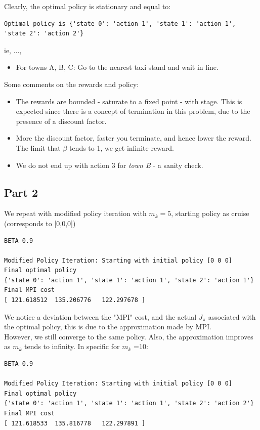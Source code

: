 Clearly, the optimal policy is stationary and equal to:
\begin{lstlisting}[numbers = none]
Optimal policy is {'state 0': 'action 1', 'state 1': 'action 1', 'state 2': 'action 2'}
\end{lstlisting}

ie, ...,

\begin{itemize}
\item For towns A, B, C:  Go to the nearest taxi stand and wait in line.
\end{itemize}

Some comments on the rewards and policy:
\begin{itemize}
\item The rewards are bounded - saturate to a fixed point - with stage. This is expected since there is a concept of termination in this problem, due to the presence of a discount factor.
\item More the discount factor, faster you terminate, and hence lower the reward. The limit that $\beta$ tends to 1, we get infinite reward.
\item We do not end up with action 3 for \textit{town B} - a sanity check.
\end{itemize}

\subsection{Part 2}

We repeat with modified policy iteration with $m_k = 5 $, starting policy as cruise (corresponds to [0,0,0])\\

\begin{lstlisting}
BETA 0.9

Modified Policy Iteration: Starting with initial policy [0 0 0]
Final optimal policy
{'state 0': 'action 1', 'state 1': 'action 1', 'state 2': 'action 1'}
Final MPI cost
[ 121.618512  135.206776   122.297678 ]
\end{lstlisting}

We notice a deviation between the "MPI" cost, and the actual $J_\pi$ associated with the optimal policy, this is due to the approximation made by MPI. \\

However, we still converge to the same policy. Also, the approximation improves as $m_k$ tends to infinity. In specific for $m_k$ =10:

\begin{lstlisting}
BETA 0.9

Modified Policy Iteration: Starting with initial policy [0 0 0]
Final optimal policy
{'state 0': 'action 1', 'state 1': 'action 1', 'state 2': 'action 2'}
Final MPI cost
[ 121.618533  135.816778   122.297891 ]
\end{lstlisting}


